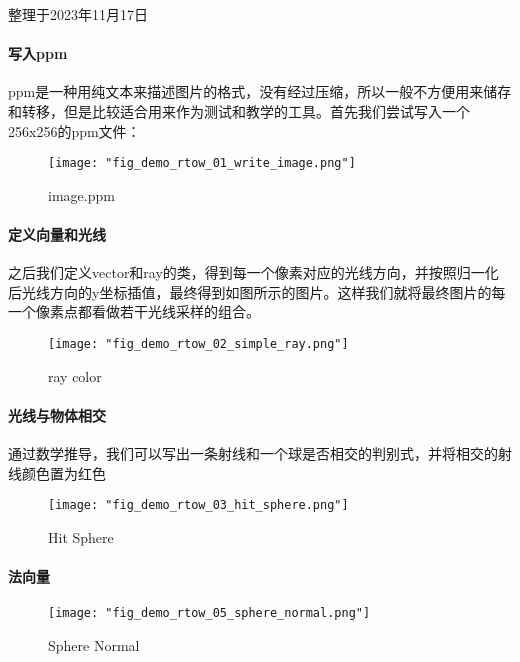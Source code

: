 整理于2023年11月17日

\paragraph{写入ppm}

ppm是一种用纯文本来描述图片的格式，没有经过压缩，所以一般不方便用来储存和转移，但是比较适合用来作为测试和教学的工具。首先我们尝试写入一个256x256的ppm文件：

\begin{figure}[H]
    \texttt{[image: "fig\_demo\_rtow\_01\_write\_image.png"]}
    \caption{image.ppm}
\end{figure}

\paragraph{定义向量和光线}

之后我们定义vector和ray的类，得到每一个像素对应的光线方向，并按照归一化后光线方向的y坐标插值，最终得到如图所示的图片。这样我们就将最终图片的每一个像素点都看做若干光线采样的组合。

\begin{figure}[H]
    \texttt{[image: "fig\_demo\_rtow\_02\_simple\_ray.png"]}
    \caption{ray color}
\end{figure}


\paragraph{光线与物体相交}

通过数学推导，我们可以写出一条射线和一个球是否相交的判别式，并将相交的射线颜色置为红色

\begin{figure}[H]
    \texttt{[image: "fig\_demo\_rtow\_03\_hit\_sphere.png"]}
    \caption{Hit Sphere}
\end{figure}

\paragraph{法向量}


\begin{figure}[H]
    \texttt{[image: "fig\_demo\_rtow\_05\_sphere\_normal.png"]}
    \caption{Sphere Normal}
\end{figure}

